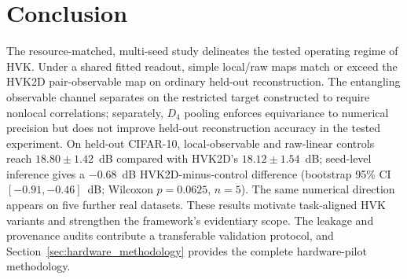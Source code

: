 \documentclass[11pt]{article}
\begin{document}
\section{Conclusion}
The resource-matched, multi-seed study delineates the tested operating regime of HVK. Under a shared fitted readout, simple local/raw maps match or exceed the HVK2D pair-observable map on ordinary held-out reconstruction. The entangling observable channel separates on the restricted target constructed to require nonlocal correlations; separately, $D_4$ pooling enforces equivariance to numerical precision but does not improve held-out reconstruction accuracy in the tested experiment. On held-out CIFAR-10, local-observable and raw-linear controls reach $18.80\pm1.42$~dB compared with HVK2D's $18.12\pm1.54$~dB; seed-level inference gives a $-0.68$~dB HVK2D-minus-control difference (bootstrap 95\% CI $[-0.91,-0.46]$~dB; Wilcoxon $p=0.0625$, $n=5$). The same numerical direction appears on five further real datasets. These results motivate task-aligned HVK variants and strengthen the framework's evidentiary scope. The leakage and provenance audits contribute a transferable validation protocol, and Section~\ref{sec:hardware_methodology} provides the complete hardware-pilot methodology.
\end{document}
